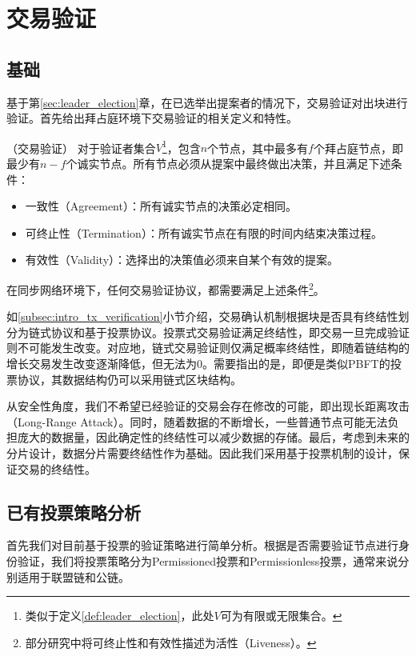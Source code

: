 \section{交易验证}
\subsection{基础}
基于第\ref{sec:leader_election}章，在已选举出提案者的情况下，交易验证对出块进行验证。首先给出拜占庭环境下交易验证的相关定义和特性。

\begin{definition}
（交易验证） 对于验证者集合$V$\footnote{类似于定义\ref{def:leader_election}，此处$V$可为有限或无限集合。}，包含$n$个节点，其中最多有$f$个拜占庭节点，即最少有$n-f$个诚实节点。所有节点必须从提案中最终做出决策，并且满足下述条件：
\begin{itemize}
	\item 一致性（Agreement）：所有诚实节点的决策必定相同。
	\item 可终止性（Termination）：所有诚实节点在有限的时间内结束决策过程。
	\item 有效性（Validity）：选择出的决策值必须来自某个有效的提案。
\end{itemize}
\end{definition}

在同步网络环境下，任何交易验证协议，都需要满足上述条件\footnote{部分研究中将可终止性和有效性描述为活性（Liveness）。}。%

如\ref{subsec:intro_tx_verification}小节介绍，交易确认机制根据块是否具有终结性划分为链式协议和基于投票协议。投票式交易验证满足终结性，即交易一旦完成验证则不可能发生改变。对应地，链式交易验证则仅满足概率终结性，即随着链结构的增长交易发生改变逐渐降低，但无法为$0$。需要指出的是，即便是类似PBFT的投票协议，其数据结构仍可以采用链式区块结构。

从安全性角度，我们不希望已经验证的交易会存在修改的可能，即出现长距离攻击（Long-Range Attack）。同时，随着数据的不断增长，一些普通节点可能无法负担庞大的数据量，因此确定性的终结性可以减少数据的存储。最后，考虑到未来的分片设计，数据分片需要终结性作为基础。因此我们采用基于投票机制的设计，保证交易的终结性。


\subsection{已有投票策略分析}
首先我们对目前基于投票的验证策略进行简单分析。根据是否需要验证节点进行身份验证，我们将投票策略分为Permissioned投票和Permissionless投票，通常来说分别适用于联盟链和公链。

